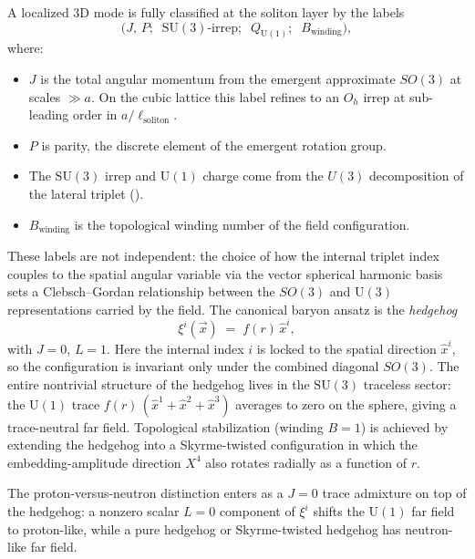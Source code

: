 A localized 3D mode is fully classified at the soliton layer by the labels
\begin{equation}
  \big( J,\,P;\;\; \mathrm{SU}(3)\text{-irrep};\;\; Q_{\mathrm{U}(1)};\;\; B_{\mathrm{winding}} \big),
  \label{eq:soliton-labels}
\end{equation}
where:
\begin{itemize}
  \item $J$ is the total angular momentum from the emergent approximate $SO(3)$ at scales $\gg a$. On the cubic
    lattice this label refines to an $O_h$ irrep at sub-leading order in $a/\ell_{\mathrm{soliton}}$.
  \item $P$ is parity, the discrete element of the emergent rotation group.
  \item The $\mathrm{SU}(3)$ irrep and $\mathrm{U}(1)$ charge come from the $U(3)$ decomposition of the lateral
    triplet ().
  \item $B_{\mathrm{winding}}$ is the topological winding number of the field configuration.
\end{itemize}

These labels are not independent: the choice of how the internal triplet index couples to the spatial angular
variable via the vector spherical harmonic basis sets a Clebsch--Gordan relationship between the $SO(3)$ and
$\mathrm{U}(3)$ representations carried by the field.
The canonical baryon ansatz is the \emph{hedgehog}
\begin{equation}
  \xi^{i}(\vec{x}) \;=\; f(r)\, \hat{x}^{i},
  \label{eq:hedgehog}
\end{equation}
with $J = 0$, $L = 1$.
Here the internal index $i$ is locked to the spatial direction $\hat{x}^i$, so the configuration is invariant only
under the combined diagonal $SO(3)$.
The entire nontrivial structure of the hedgehog lives in the $\mathrm{SU}(3)$ traceless sector: the $\mathrm{U}(1)$
trace $f(r)\,(\hat{x}^1 + \hat{x}^2 + \hat{x}^3)$ averages to zero on the sphere, giving a trace-neutral far field.
Topological stabilization (winding $B = 1$) is achieved by extending the hedgehog into a Skyrme-twisted
configuration in which the embedding-amplitude direction $X^4$ also rotates radially as a function of $r$.

The proton-versus-neutron distinction enters as a $J = 0$ trace admixture on top of the hedgehog: a nonzero
scalar $L = 0$ component of $\xi^i$ shifts the $\mathrm{U}(1)$ far field to proton-like, while a pure hedgehog or
Skyrme-twisted hedgehog has neutron-like far field.

